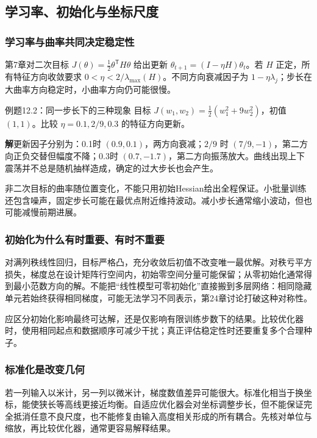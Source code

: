 \documentclass[UTF8,fontset=none,zihao=-4,a4paper]{ctexart}
\newcommand{\sol}{\par\noindent\textbf{解}\quad}
\numberwithin{equation}{section}
\numberwithin{figure}{section}
\begin{document}
\subsection{学习率、初始化与坐标尺度}
\subsubsection{学习率与曲率共同决定稳定性}
第7章对二次目标 $J(\theta)=\tfrac12\theta^{\mathsf T}H\theta$ 给出更新 $\theta_{t+1}=(I-\eta H)\theta_t$。若 $H$ 正定，所有特征方向收敛要求 $0<\eta<2/\lambda_{\max}(H)$。不同方向衰减因子为 $1-\eta\lambda_j$；步长在大曲率方向稳定时，小曲率方向仍可能很慢。

\begin{infobox}{例题12.2：同一步长下的三种现象}
目标 $J(w_1,w_2)=\tfrac12(w_1^2+9w_2^2)$，初值 $(1,1)$。比较 $\eta=0.1,2/9,0.3$ 的特征方向更新。
\end{infobox}
\sol 更新因子分别为：0.1时 $(0.9,0.1)$，两方向衰减；$2/9$ 时 $(7/9,-1)$，第二方向正负交替但幅度不降；0.3时 $(0.7,-1.7)$，第二方向振荡放大。曲线出现上下震荡并不总是随机抽样造成，确定的过大步长也会产生。

非二次目标的曲率随位置变化，不能只用初始Hessian给出全程保证。小批量训练还包含噪声，固定步长可能在最优点附近维持波动。减小步长通常缩小波动，但也可能减慢前期进展。

\subsubsection{初始化为什么有时重要、有时不重要}
对满列秩线性回归，目标严格凸，充分收敛后初值不改变唯一最优解。对秩亏平方损失，梯度总在设计矩阵行空间内，初始零空间分量可能保留；从零初始化通常得到最小范数方向的解。不能把“线性模型可零初始化”直接搬到多层网络：相同隐藏单元若始终获得相同梯度，可能无法学习不同表示，第24章讨论打破这种对称性。

应区分初始化影响最终可达解，还是仅影响有限训练步数下的结果。比较优化器时，使用相同起点和数据顺序可减少干扰；真正评估稳定性时还要重复多个合理种子。

\subsubsection{标准化是改变几何}
若一列输入以米计，另一列以微米计，梯度数值差异可能很大。标准化相当于换坐标，能使狭长等高线更接近均衡。自适应优化器会对坐标调整步长，但不能保证完全抵消任意不良尺度，也不能修复由输入高度相关形成的所有耦合。先核对单位与缩放，再比较优化器，通常更容易解释结果。
\end{document}
